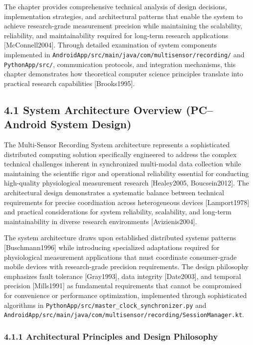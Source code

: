 \documentclass[12pt,a4paper]{article}
\begin{document}
The chapter provides comprehensive technical analysis of design decisions, implementation strategies, and architectural
patterns that enable the system to achieve research-grade measurement precision while maintaining the scalability,
reliability, and maintainability required for long-term research applications [McConnell2004]. Through detailed
examination of system components implemented in \texttt{AndroidApp/src/main/java/com/multisensor/recording/} and
\texttt{PythonApp/src/}, communication protocols, and integration mechanisms, this chapter demonstrates how theoretical
computer science principles translate into practical research capabilities [Brooks1995].

\subsection{4.1 System Architecture Overview (PC–Android System Design)}

The Multi-Sensor Recording System architecture represents a sophisticated distributed computing solution specifically
engineered to address the complex technical challenges inherent in synchronized multi-modal data collection while
maintaining the scientific rigor and operational reliability essential for conducting high-quality physiological
measurement research [Healey2005, Boucsein2012]. The architectural design demonstrates a systematic balance between
technical requirements for precise coordination across heterogeneous devices [Lamport1978] and practical considerations
for system reliability, scalability, and long-term maintainability in diverse research environments [Avizienis2004].

The system architecture draws upon established distributed systems patterns [Buschmann1996] while introducing
specialized adaptations required for physiological measurement applications that must coordinate consumer-grade mobile
devices with research-grade precision requirements. The design philosophy emphasizes fault tolerance [Gray1993], data
integrity [Date2003], and temporal precision [Mills1991] as fundamental requirements that cannot be compromised for
convenience or performance optimization, implemented through sophisticated algorithms in
\texttt{PythonApp/src/master\_clock\_synchronizer.py} and \texttt{AndroidApp/src/main/java/com/multisensor/recording/SessionManager.kt}.

\subsubsection{4.1.1 Architectural Principles and Design Philosophy}
\end{document}
